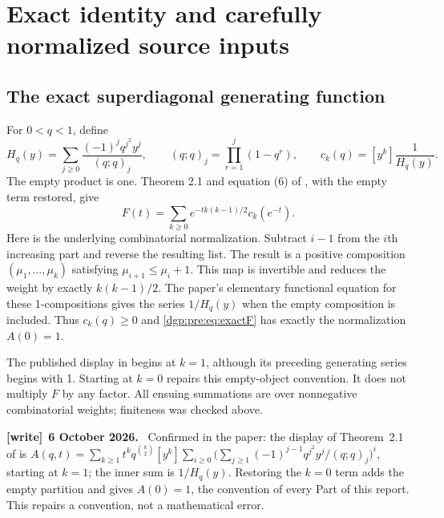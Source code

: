 \documentclass[11pt,letterpaper]{article}
\numberwithin{equation}{section}
\theoremstyle{remark}\newtheorem{remark}[theorem]{Remark}
\newenvironment{writenote}[1][]{\par\smallskip\begingroup\small
 \noindent\textbf{[write]}\if\relax\detokenize{#1}\relax\else~\textbf{#1.}\fi\ }%
 {\par\endgroup\smallskip}
\begin{document}
\section{Exact identity and carefully normalized source inputs}\label{dgp:pre:sec:inputs}
\subsection{The exact superdiagonal generating function}
For $0<q<1$, define
\begin{equation}
 H_q(y)=\sum_{j\geq0}\frac{(-1)^j q^{j^2}y^j}{(q;q)_j},
 \qquad (q;q)_j=\prod_{r=1}^j(1-q^r),\qquad
 c_k(q)=[y^k]\frac1{H_q(y)}.
 \label{dgp:pre:eq:H}
\end{equation}
The empty product is one. Theorem 2.1 and equation (6) of
\cite{abek}, with the empty term restored, give
\begin{equation}
 F(t)=\sum_{k\geq0}e^{-t k(k-1)/2}c_k(e^{-t}).
 \label{dgp:pre:eq:exactF}
\end{equation}
Here is the underlying combinatorial normalization. Subtract $i-1$
from the $i$th increasing part and reverse the resulting list. The
result is a positive composition $(\mu_1,\ldots,\mu_k)$ satisfying
$\mu_{i+1}\leq\mu_i+1$. This map is invertible and reduces the weight by
exactly $k(k-1)/2$. The paper's elementary functional equation for these
1-compositions gives the series $1/H_q(y)$ when the empty composition
is included. Thus $c_k(q)\geq0$ and \eqref{dgp:pre:eq:exactF} has exactly the
normalization $A(0)=1$.

The published display in \cite{abek} begins at $k=1$, although its
preceding generating series begins with 1. Starting at $k=0$ repairs
this empty-object convention. It does not multiply $F$ by any factor.
All ensuing summations are over nonnegative combinatorial weights;
finiteness was checked above.
\begin{writenote}[6 October 2026]
Confirmed in the paper: the display of Theorem~2.1 of \cite{abek} is $A(q,t)=\sum_{k\ge1}t^kq^{\binom k2}[y^k]\sum_{i\ge0}\bigl(\sum_{j\ge1}(-1)^{j-1}q^{j^2}y^j/(q;q)_j\bigr)^i$, starting at $k=1$; the inner sum is $1/H_q(y)$. Restoring the $k=0$ term adds the empty partition and gives $A(0)=1$, the convention of every Part of this report. This repairs a convention, not a mathematical error.
\end{writenote}
\end{document}

